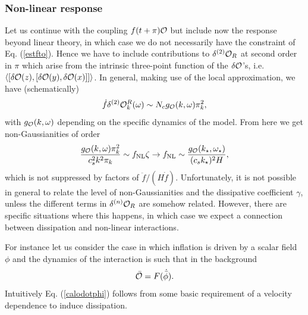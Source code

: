 \documentclass[11pt,amsmath,floats,floatfix,nofootinbib,secnumarabic, superscriptaddress, tightenlines]{revtex4}
\newcommand{\beq}{\begin{equation}}
\newcommand{\eeq}{\end{equation}}
\newcommand{\calo}{{\cal O}}
\newcommand{\bphi}{{\bar\phi}}
\begin{document}
{\subsubsection{Non-linear response}\label{nlrep}

Let us continue with the coupling $f(t+\pi)\calo$ but include now the response beyond linear theory, in which case we do not necessarily have the constraint of Eq. (\ref{estfto}). Hence we have to include contributions to $\delta^{(2)}\calo_R$ at second order in $\pi$ which arise from the intrinsic three-point function of the $\delta\calo$'s, i.e. $\langle [\delta\calo(z),[\delta\calo(y),\delta\calo(x)]]\rangle$.
In general, making use of the local approximation, we have (schematically)
\beq
\dot f \delta^{(2)}\calo^R_k(\omega) \sim N_c g_\calo(k,\omega)\pi_k^2,
\eeq
with $g_\calo(k,\omega)$ depending on the specific dynamics of the model. From here we get non-Gaussianities of order
\beq
\label{gk2}
 \frac{g_\calo(k,\omega) \pi_k^2}{c_s^2k^2\pi_k}\sim f_{\rm NL}\zeta \to f_{\rm NL} \sim \frac{g_\calo({k_\star},\omega_\star)}{(c_s k_\star)^2 H},
\eeq
which is not suppressed by factors of $\ddot f/(H\dot f)$. Unfortunately, it is not possible in general to relate the level of non-Gaussianities and the dissipative
 coefficient $\gamma$, unless the different terms in $\delta^{(n)} \calo_R$ are somehow related. However, there are specific situations where this happens, in which case we expect a connection between dissipation and non-linear interactions. 
 
 For instance let us consider the case in which inflation is driven by a scalar field $\phi$ and the dynamics of the interaction is such that in the background
\beq
\label{calodotphi}
 \bar\calo = F(\dot\bphi).
\eeq
Intuitively Eq. (\ref{calodotphi}) follows from some basic requirement of a velocity dependence to induce dissipation. 

}
\end{document}
